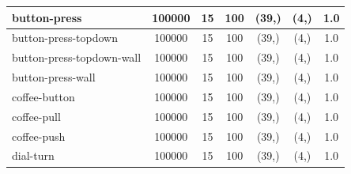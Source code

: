 \documentclass{article}
\theoremstyle{plain}
\theoremstyle{definition}
\theoremstyle{remark}
\begin{document}
\begin{table}[]
{\begin{tabular}{|l|c|c|c|c|c|c|}
button-press                        & 100000                                        & 15                                                   & 100                                             & (39,)                                           & (4,) & 1.0                                            \\ \hline
button-press-topdown                & 100000                                        & 15                                                   & 100                                             & (39,)                                           & (4,) & 1.0                                            \\ \hline
button-press-topdown-wall           & 100000                                        & 15                                                   & 100                                             & (39,)                                           & (4,) & 1.0                                            \\ \hline
button-press-wall                   & 100000                                        & 15                                                   & 100                                             & (39,)                                           & (4,) & 1.0                                            \\ \hline
coffee-button                       & 100000                                        & 15                                                   & 100                                             & (39,)                                           & (4,) & 1.0                                            \\ \hline
coffee-pull                         & 100000                                        & 15                                                   & 100                                             & (39,)                                           & (4,) & 1.0                                            \\ \hline
coffee-push                         & 100000                                        & 15                                                   & 100                                             & (39,)                                           & (4,) & 1.0                                            \\ \hline
dial-turn                           & 100000                                        & 15                                                   & 100                                             & (39,)                                           & (4,) & 1.0                                            \\ \hline

\end{tabular}}
\end{table}
\end{document}
